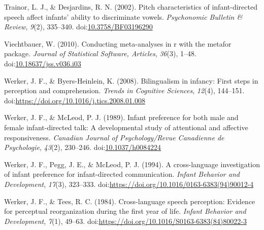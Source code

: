 \documentclass[,man,floatsintext]{apa6}
\begin{document}
\leavevmode\hypertarget{ref-trainor_2002}{}%
Trainor, L. J., \& Desjardins, R. N. (2002). Pitch characteristics of infant-directed speech affect infants' ability to discriminate vowels. \emph{Psychonomic Bulletin \& Review}, \emph{9}(2), 335--340. doi:\href{https://doi.org/10.3758/BF03196290}{10.3758/BF03196290}

\leavevmode\hypertarget{ref-viechtbauer_2010}{}%
Viechtbauer, W. (2010). Conducting meta-analyses in r with the metafor package. \emph{Journal of Statistical Software, Articles}, \emph{36}(3), 1--48. doi:\href{https://doi.org/10.18637/jss.v036.i03}{10.18637/jss.v036.i03}

\leavevmode\hypertarget{ref-werker_2008}{}%
Werker, J. F., \& Byers-Heinlein, K. (2008). Bilingualism in infancy: First steps in perception and comprehension. \emph{Trends in Cognitive Sciences}, \emph{12}(4), 144--151. doi:\href{https://doi.org/https://doi.org/10.1016/j.tics.2008.01.008}{https://doi.org/10.1016/j.tics.2008.01.008}

\leavevmode\hypertarget{ref-werker_1989}{}%
Werker, J. F., \& McLeod, P. J. (1989). Infant preference for both male and female infant-directed talk: A developmental study of attentional and affective responsiveness. \emph{Canadian Journal of Psychology/Revue Canadienne de Psychologie}, \emph{43}(2), 230--246. doi:\href{https://doi.org/10.1037/h0084224}{10.1037/h0084224}

\leavevmode\hypertarget{ref-werker_1994}{}%
Werker, J. F., Pegg, J. E., \& McLeod, P. J. (1994). A cross-language investigation of infant preference for infant-directed communication. \emph{Infant Behavior and Development}, \emph{17}(3), 323--333. doi:\href{https://doi.org/https://doi.org/10.1016/0163-6383(94)90012-4}{https://doi.org/10.1016/0163-6383(94)90012-4}

\leavevmode\hypertarget{ref-werker_1984}{}%
Werker, J. F., \& Tees, R. C. (1984). Cross-language speech perception: Evidence for perceptual reorganization during the first year of life. \emph{Infant Behavior and Development}, \emph{7}(1), 49--63. doi:\href{https://doi.org/https://doi.org/10.1016/S0163-6383(84)80022-3}{https://doi.org/10.1016/S0163-6383(84)80022-3}

\endgroup

\clearpage
\makeatletter
\efloat@restorefloats
\makeatother
\end{document}
